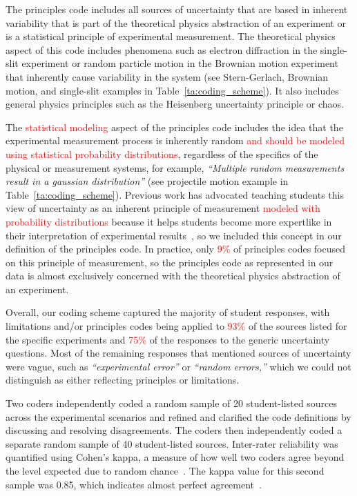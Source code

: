 \documentclass[english,aps,prstper,reprint,showpacs,longbibliography,superscriptaddress,nofootinbib]{revtex4-2}
\begin{document}
The principles code includes all sources of uncertainty that are based in inherent variability that is part of the theoretical physics abstraction of an experiment or is a statistical principle of experimental measurement. The theoretical physics aspect of this code includes phenomena such as electron diffraction in the single-slit experiment or random particle motion in the Brownian motion experiment that inherently cause variability in the system (see Stern-Gerlach, Brownian motion, and single-slit examples in Table~\ref{ta:coding_scheme}). It also includes general physics principles such as the Heisenberg uncertainty principle or chaos. 

The \textcolor{red}{statistical modeling} aspect of the principles code includes the idea that the experimental measurement process is inherently random \textcolor{red}{and should be modeled using statistical probability distributions}, regardless of the specifics of the physical or measurement systems, for example, \textit{``Multiple random measurements result in a gaussian distribution''} (see projectile motion example in Table~\ref{ta:coding_scheme}). Previous work has advocated teaching students this view of uncertainty as an inherent principle of measurement \textcolor{red}{modeled with probability distributions} because it helps students become more expertlike in their interpretation of experimental results~\cite{Evangelinos1999,Evangelinos2002,Allie2003,Pillay2008,Buffler2008}, so we included this concept in our definition of the principles code. In practice, only \textcolor{red}{9\%} of principles codes focused on this principle of measurement, so the principles code as represented in our data is almost exclusively concerned with the theoretical physics abstraction of an experiment.

Overall, our coding scheme captured the majority of student responses, with limitations and/or principles codes being applied to \textcolor{red}{93\%} of the sources listed for the specific experiments and \textcolor{red}{75\%} of the responses to the generic uncertainty questions. Most of the remaining responses that mentioned sources of uncertainty were vague, such as \textit{``experimental error''} or \textit{``random errors,''} which we could not distinguish as either reflecting principles or limitations. 

Two coders independently coded a random sample of 20 student-listed sources across the experimental scenarios and refined and clarified the code definitions by discussing and resolving disagreements. The coders then independently coded a separate random sample of 40 student-listed sources. Inter-rater reliability was quantified using Cohen's kappa, a measure of how well two coders agree beyond the level expected due to random chance~\cite{Cohen1960}. The kappa value for this second sample was 0.85, which indicates almost perfect agreement~\cite{Landis1977}. 
\end{document}
